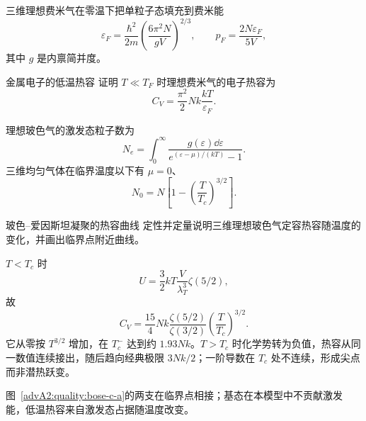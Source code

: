三维理想费米气在零温下把单粒子态填充到费米能
\[
 \varepsilon_F=\frac{\hbar^2}{2m}
 \left(\frac{6\pi^2N}{gV}\right)^{2/3},
 \qquad p_F=\frac{2N\varepsilon_F}{5V},
\]
其中 $g$ 是内禀简并度。

\begin{advexamplebox}{金属电子的低温热容}\label{advA2:ex:fermi-heat-capacity}
证明 $T\ll T_F$ 时理想费米气的电子热容为
\[
 \boxed{C_V=\frac{\pi^2}{2}Nk\frac{kT}{\varepsilon_F}}.
\]

\AQFermiCapacity
\end{advexamplebox}
\begin{advsolution}

\end{advsolution}

理想玻色气的激发态粒子数为
\[
 N_e=\int_0^\infty\frac{g(\varepsilon)\dd\varepsilon}
 {e^{(\varepsilon-\mu)/(kT)}-1}.
\]
三维均匀气体在临界温度以下有 $\mu=0$、
\[
 N_0=N\left[1-\left(\frac T{T_c}\right)^{3/2}\right].
\]

\begin{advexamplebox}{玻色--爱因斯坦凝聚的热容曲线}\label{advA2:ex:bec-heat-capacity}
定性并定量说明三维理想玻色气定容热容随温度的变化，并画出临界点附近曲线。

\AQBoseCapacity
\end{advexamplebox}
\begin{advsolution}
\AABoseCapacity

$T<T_c$ 时
\[
 U=\frac32kT\frac{V}{\lambda_T^3}\zeta(5/2),
\]
故
\[
 \boxed{C_V=\frac{15}{4}Nk
 \frac{\zeta(5/2)}{\zeta(3/2)}
 \left(\frac T{T_c}\right)^{3/2}}.
\]
它从零按 $T^{3/2}$ 增加，在 $T_c^-$ 达到约 $1.93Nk$。$T>T_c$ 时化学势转为负值，热容从同一数值连续接出，随后趋向经典极限 $3Nk/2$；一阶导数在 $T_c$ 处不连续，形成尖点而非潜热跃变。


图~\ref{advA2:quality:bose-c-a}的两支在临界点相接；基态在本模型中不贡献激发能，低温热容来自激发态占据随温度改变。
\end{advsolution}


